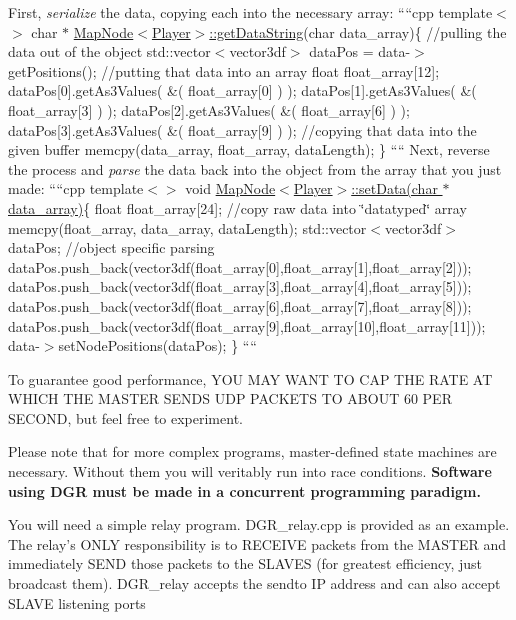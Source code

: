 \begin{DoxyItemize}
First, {\itshape serialize} the data, copying each into the necessary array\+: ````cpp template$<$$>$ char $\ast$ \hyperlink{classMapNode_aec1d6c32ce5cf507bdf8459cdd9a00b8}{Map\+Node$<$\+Player$>$\+::get\+Data\+String}(char data\+\_\+array)\{ //pulling the data out of the object std\+::vector$<$vector3df$>$ data\+Pos = data-\/$>$get\+Positions(); //putting that data into an array float float\+\_\+array\mbox{[}12\mbox{]}; data\+Pos\mbox{[}0\mbox{]}.get\+As3\+Values( \&( float\+\_\+array\mbox{[}0\mbox{]} ) ); data\+Pos\mbox{[}1\mbox{]}.get\+As3\+Values( \&( float\+\_\+array\mbox{[}3\mbox{]} ) ); data\+Pos\mbox{[}2\mbox{]}.get\+As3\+Values( \&( float\+\_\+array\mbox{[}6\mbox{]} ) ); data\+Pos\mbox{[}3\mbox{]}.get\+As3\+Values( \&( float\+\_\+array\mbox{[}9\mbox{]} ) ); //copying that data into the given buffer memcpy(data\+\_\+array, float\+\_\+array, data\+Length); \} ```` Next, reverse the process and {\itshape parse} the data back into the object from the array that you just made\+: ````cpp template$<$$>$ void \hyperlink{classMapNode_a78cc24f37a1d1b4bda5075284ff53f92}{Map\+Node$<$\+Player$>$\+::set\+Data(char $\ast$ data\+\_\+array)}\{ float float\+\_\+array\mbox{[}24\mbox{]}; //copy raw data into \char`\"{}datatyped\char`\"{} array memcpy(float\+\_\+array, data\+\_\+array, data\+Length); std\+::vector$<$vector3df$>$ data\+Pos; //object specific parsing data\+Pos.\+push\+\_\+back(vector3df(float\+\_\+array\mbox{[}0\mbox{]},float\+\_\+array\mbox{[}1\mbox{]},float\+\_\+array\mbox{[}2\mbox{]})); data\+Pos.\+push\+\_\+back(vector3df(float\+\_\+array\mbox{[}3\mbox{]},float\+\_\+array\mbox{[}4\mbox{]},float\+\_\+array\mbox{[}5\mbox{]})); data\+Pos.\+push\+\_\+back(vector3df(float\+\_\+array\mbox{[}6\mbox{]},float\+\_\+array\mbox{[}7\mbox{]},float\+\_\+array\mbox{[}8\mbox{]})); data\+Pos.\+push\+\_\+back(vector3df(float\+\_\+array\mbox{[}9\mbox{]},float\+\_\+array\mbox{[}10\mbox{]},float\+\_\+array\mbox{[}11\mbox{]})); data-\/$>$set\+Node\+Positions(data\+Pos); \} ````
\item To guarantee good performance, Y\+O\+U M\+A\+Y W\+A\+N\+T T\+O C\+A\+P T\+H\+E R\+A\+T\+E A\+T W\+H\+I\+C\+H T\+H\+E M\+A\+S\+T\+E\+R S\+E\+N\+D\+S U\+D\+P P\+A\+C\+K\+E\+T\+S T\+O A\+B\+O\+U\+T 60 P\+E\+R S\+E\+C\+O\+N\+D, but feel free to experiment.
\item Please note that for more complex programs, master-\/defined state machines are necessary. Without them you will veritably run into race conditions. {\bfseries Software using D\+G\+R must be made in a concurrent programming paradigm.}
\item You will need a simple relay program. D\+G\+R\+\_\+relay.\+cpp is provided as an example. The relay's O\+N\+L\+Y responsibility is to R\+E\+C\+E\+I\+V\+E packets from the M\+A\+S\+T\+E\+R and immediately S\+E\+N\+D those packets to the S\+L\+A\+V\+E\+S (for greatest efficiency, just broadcast them). D\+G\+R\+\_\+relay accepts the sendto I\+P address and can also accept S\+L\+A\+V\+E listening ports

\end{DoxyItemize}
